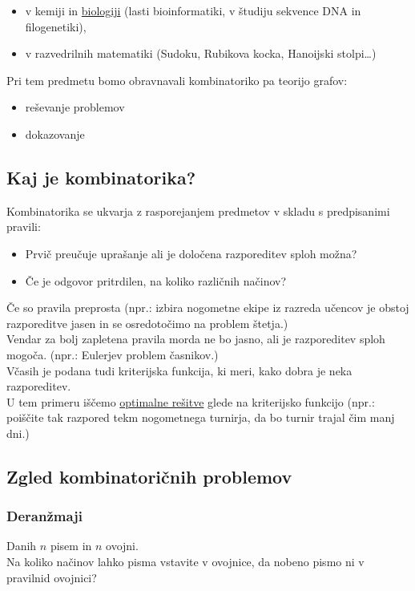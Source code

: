 \begin{itemize}
    \item v kemiji in \underline{biologiji} (lasti bioinformatiki, v študiju sekvence DNA in filogenetiki),
    \item v razvedrilnih matematiki (Sudoku, Rubikova kocka, Hanoijski stolpi\dots)
\end{itemize}
Pri tem predmetu bomo obravnavali kombinatoriko pa teorijo grafov:
\begin{itemize}
    \item reševanje problemov
    \item dokazovanje
\end{itemize}

\subsection{Kaj je kombinatorika?}
Kombinatorika se ukvarja z rasporejanjem predmetov v skladu s predpisanimi pravili:
\begin{itemize}
    \item Prvič preučuje uprašanje ali je določena razporeditev sploh možna?
    \item Če je odgovor pritrdilen, na koliko različnih načinov?
\end{itemize}

\noindent
Če so pravila preprosta (npr.: izbira nogometne ekipe iz razreda učencov je obstoj razporeditve jasen in se osredotočimo na problem štetja.) \\

\noindent
Vendar za bolj zapletena pravila morda ne bo jasno, ali je razporeditev sploh mogoča. (npr.: Eulerjev problem časnikov.) \\

\noindent
Včasih je podana tudi kriterijska funkcija, ki meri, kako dobra je neka razporeditev. \\
U tem primeru iščemo \underline{optimalne rešitve} glede na kriterijsko funkcijo (npr.: poiščite tak razpored tekm nogometnega turnirja, da bo turnir trajal čim manj dni.)

\subsection{Zgled kombinatoričnih problemov}
\subsubsection{Deranžmaji}
\begin{center}
\end{center}
Danih $n$ pisem in $n$ ovojni. \\
Na koliko načinov lahko pisma vstavite v ovojnice, da nobeno pismo ni v pravilnid ovojnici? \\

